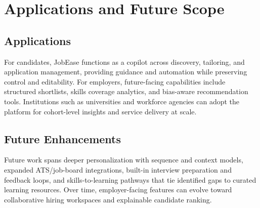 \documentclass[12pt,a4paper]{report}
\begin{document}
\chapter{Applications and Future Scope}
\section{Applications}
For candidates, JobEase functions as a copilot across discovery, tailoring, and application management, providing guidance and automation while preserving control and editability. For employers, future-facing capabilities include structured shortlists, skills coverage analytics, and bias-aware recommendation tools. Institutions such as universities and workforce agencies can adopt the platform for cohort-level insights and service delivery at scale.

\section{Future Enhancements}
Future work spans deeper personalization with sequence and context models, expanded ATS/job-board integrations, built-in interview preparation and feedback loops, and skills-to-learning pathways that tie identified gaps to curated learning resources. Over time, employer-facing features can evolve toward collaborative hiring workspaces and explainable candidate ranking.

\end{document}

